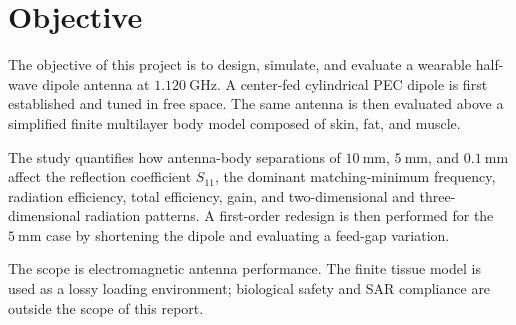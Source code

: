 \chapter*{Objective}

The objective of this project is to design, simulate, and evaluate a wearable half-wave dipole antenna at \(1.120~\mathrm{GHz}\). A center-fed cylindrical PEC dipole is first established and tuned in free space. The same antenna is then evaluated above a simplified finite multilayer body model composed of skin, fat, and muscle.

The study quantifies how antenna-body separations of \(10~\mathrm{mm}\), \(5~\mathrm{mm}\), and \(0.1~\mathrm{mm}\) affect the reflection coefficient \(S_{11}\), the dominant matching-minimum frequency, radiation efficiency, total efficiency, gain, and two-dimensional and three-dimensional radiation patterns. A first-order redesign is then performed for the \(5~\mathrm{mm}\) case by shortening the dipole and evaluating a feed-gap variation.

The scope is electromagnetic antenna performance. The finite tissue model is used as a lossy loading environment; biological safety and SAR compliance are outside the scope of this report.
